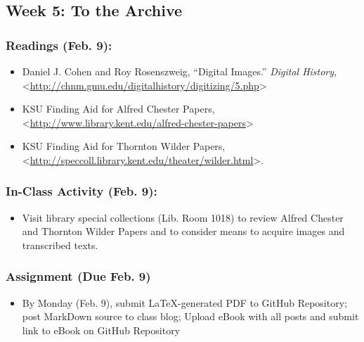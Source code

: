\documentclass[]{article}
\begin{document}
\subsection{Week 5: To the Archive}\label{week-5-to-the-archive}

\subsubsection{Readings (Feb. 9):}\label{readings-feb.-9}

\begin{itemize}
\itemsep1pt\parskip0pt
\item
  Daniel J. Cohen and Roy Rosenszweig, ``Digital Images.'' \emph{Digital
  History,}
  \textless{}\url{http://chnm.gmu.edu/digitalhistory/digitizing/5.php}\textgreater{}
\item
  KSU Finding Aid for Alfred Chester Papers,
  \textless{}\url{http://www.library.kent.edu/alfred-chester-papers}\textgreater{}
\item
  KSU Finding Aid for Thornton Wilder Papers,
  \textless{}\url{http://speccoll.library.kent.edu/theater/wilder.html}\textgreater{}.
\end{itemize}

\subsubsection{In-Class Activity (Feb.
9):}\label{in-class-activity-feb.-9}

\begin{itemize}
\itemsep1pt\parskip0pt
\item
  Visit library special collections (Lib. Room 1018) to review Alfred
  Chester and Thornton Wilder Papers and to consider means to acquire
  images and transcribed texts.
\end{itemize}

\subsubsection{Assignment (Due Feb. 9)}\label{assignment-due-feb.-9}

\begin{itemize}
\itemsep1pt\parskip0pt
\item
  By Monday (Feb. 9), submit LaTeX-generated PDF to GitHub Repository;
  post MarkDown source to class blog; Upload eBook with all posts and
  submit link to eBook on GitHub Repository
\end{itemize}
\end{document}
